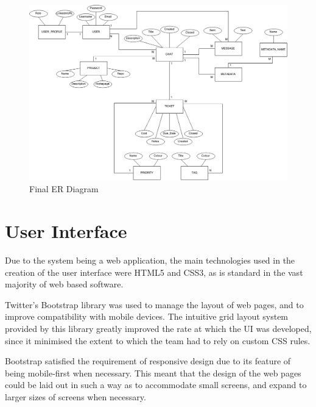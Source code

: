 \documentclass[a4paper]{l3proj}
\begin{document}
\begin{figure}[ht]
\centering
\includegraphics[scale=0.35]{newERdiagram}
\caption{Final ER Diagram}
\label{figure:ERDiagram}
\end{figure}
\section{User Interface}
\label{userInterface}

Due to the system being a web application, the main technologies used in the creation of the user interface were HTML5 and CSS3, as is standard in the vast majority of web based software. 

Twitter’s Bootstrap library was used to manage the layout of web pages, and to improve compatibility with mobile devices. The intuitive grid layout system provided by this library greatly improved the rate at which the UI was developed, since it minimised the extent to which the team had to rely on custom CSS rules.

Bootstrap satisfied the requirement of responsive design due to its feature of being mobile-first when necessary. This meant that the design of the web pages could be laid out in such a way as to accommodate small screens, and expand to larger sizes of screens when necessary.
\end{document}
